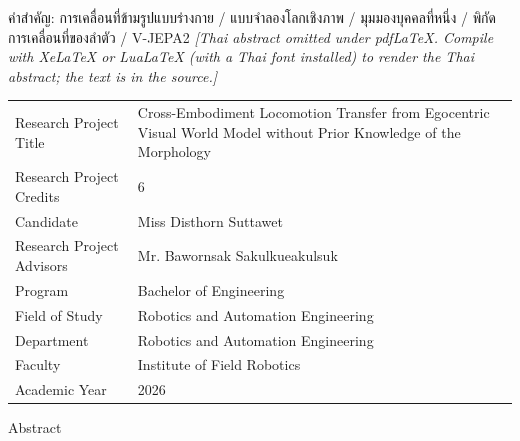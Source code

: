 \documentclass[12pt,a4paper,oneside]{report}
\begin{document}
{\vspace{4mm}
\noindent คำสำคัญ: การเคลื่อนที่ข้ามรูปแบบร่างกาย / แบบจำลองโลกเชิงภาพ / มุมมองบุคคลที่หนึ่ง / พิกัดการเคลื่อนที่ของลำตัว / V-JEPA2
}
\else
\noindent\emph{[Thai abstract omitted under pdfLaTeX. Compile with XeLaTeX or LuaLaTeX
(with a Thai font installed) to render the Thai abstract; the text is in the source.]}
\fi
\clearpage

\thispagestyle{fancy}
\noindent
\begin{tabular}{@{}p{4.8cm}p{9.7cm}@{}}
Research Project Title    & Cross-Embodiment Locomotion Transfer from Egocentric Visual World Model without Prior Knowledge of the Morphology\\[2mm]
Research Project Credits  & 6\\[2mm]
Candidate                 & Miss Disthorn Suttawet\\[2mm]
Research Project Advisors & Mr. Bawornsak Sakulkueakulsuk\\[2mm]
Program                   & Bachelor of Engineering\\[2mm]
Field of Study            & Robotics and Automation Engineering\\[2mm]
Department                & Robotics and Automation Engineering\\[2mm]
Faculty                   & Institute of Field Robotics\\[2mm]
Academic Year             & 2026\\
\end{tabular}

\vspace{6mm}
\begin{center}Abstract\end{center}
\vspace{1mm}
\end{document}
